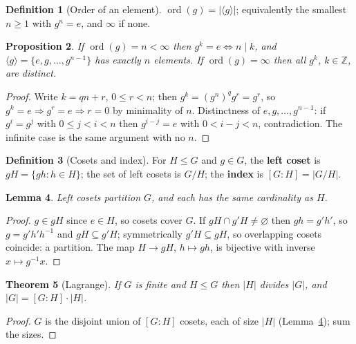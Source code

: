 \documentclass[11pt,a4paper]{article}
\newtheorem{theorem}{Theorem}[section]
\newtheorem{lemma}[theorem]{Lemma}
\newtheorem{proposition}[theorem]{Proposition}
\theoremstyle{definition}
\newtheorem{definition}[theorem]{Definition}
\newcommand{\Z}{\mathbb{Z}}
\newcommand{\ord}{\operatorname{ord}}
\begin{document}
	\begin{definition}[Order of an element]
		$\ord(g)=|\langle g\rangle|$; equivalently the smallest $n\ge1$ with $g^n=e$, and $\infty$ if none.
	\end{definition}
	
	\begin{proposition}\label{prop:order}
		If $\ord(g)=n<\infty$ then $g^k=e\iff n\mid k$, and $\langle g\rangle=\{e,g,\dots,g^{n-1}\}$ has
		exactly $n$ elements. If $\ord(g)=\infty$ then all $g^k$, $k\in\Z$, are distinct.
	\end{proposition}
	\begin{proof}
		Write $k=qn+r$, $0\le r<n$; then $g^k=(g^n)^q g^r=g^r$, so $g^k=e\Rightarrow g^r=e\Rightarrow r=0$ by
		minimality of $n$. Distinctness of $e,g,\dots,g^{n-1}$: if $g^i=g^j$ with $0\le j<i<n$ then
		$g^{i-j}=e$ with $0<i-j<n$, contradiction. The infinite case is the same argument with no $n$.
	\end{proof}
	
	\begin{definition}[Cosets and index]
		For $H\le G$ and $g\in G$, the \textbf{left coset} is $gH=\{gh:h\in H\}$; the set of left cosets is
		$G/H$; the \textbf{index} is $[G:H]=|G/H|$.
	\end{definition}
	
	\begin{lemma}\label{lem:cosets}
		Left cosets partition $G$, and each has the same cardinality as $H$.
	\end{lemma}
	\begin{proof}
		$g\in gH$ since $e\in H$, so cosets cover $G$. If $gH\cap g'H\neq\varnothing$ then $gh=g'h'$, so
		$g=g'h'h^{-1}$ and $gH\subseteq g'H$; symmetrically $g'H\subseteq gH$, so overlapping cosets coincide:
		a partition. The map $H\to gH$, $h\mapsto gh$, is bijective with inverse $x\mapsto g^{-1}x$.
	\end{proof}
	
	\begin{theorem}[Lagrange]\label{thm:lagrange}
		If $G$ is finite and $H\le G$ then $|H|$ divides $|G|$, and $|G|=[G:H]\cdot|H|$.
	\end{theorem}
	\begin{proof}
		$G$ is the disjoint union of $[G:H]$ cosets, each of size $|H|$ (Lemma~\ref{lem:cosets}); sum the sizes.
	\end{proof}
	
\end{document}
